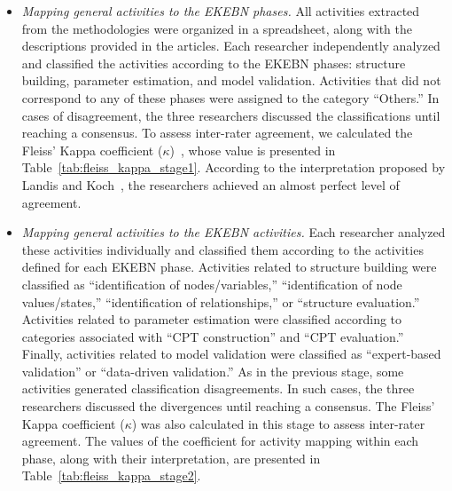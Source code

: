 \begin{itemize}
\item \textit{Mapping general activities to the EKEBN phases.}  All activities extracted from the methodologies were organized in a spreadsheet, along with the descriptions provided in the articles. Each researcher independently analyzed and classified the activities according to the EKEBN phases: structure building, parameter estimation, and model validation. Activities that did not correspond to any of these phases were assigned to the category ``Others.'' In cases of disagreement, the three researchers discussed the classifications until reaching a consensus. To assess inter-rater agreement, we calculated the Fleiss' Kappa coefficient ($\kappa$)~\cite{fleiss1971measuring}, whose value is presented in Table~\ref{tab:fleiss_kappa_stage1}. According to the interpretation proposed by Landis and Koch~\cite{landis1977measurement}, the researchers achieved an almost perfect level of agreement.

\item \textit{Mapping general activities to the EKEBN activities.}  Each researcher analyzed these activities individually and classified them according to the activities defined for each EKEBN phase. Activities related to structure building were classified as ``identification of nodes/variables,'' ``identification of node values/states,'' ``identification of relationships,'' or ``structure evaluation.'' Activities related to parameter estimation were classified according to categories associated with ``CPT construction'' and ``CPT evaluation.'' Finally, activities related to model validation were classified as ``expert-based validation'' or ``data-driven validation.''  As in the previous stage, some activities generated classification disagreements. In such cases, the three researchers discussed the divergences until reaching a consensus. The Fleiss' Kappa coefficient ($\kappa$) was also calculated in this stage to assess inter-rater agreement. The values of the coefficient for activity mapping within each phase, along with their interpretation, are presented in Table~\ref{tab:fleiss_kappa_stage2}.
\end{itemize}


